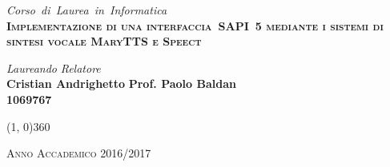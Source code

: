 \documentclass[a4paper, 12pt, twoside, openright]{book}
\begin{document}
\begin{titlepage}
\begin{center}
\vspace{0.3cm} %
\emph{\Large{Corso~di~Laurea~in~Informatica}} \\
\vspace{1.5cm}
\scshape{\Large{\bfseries{Implementazione di una interfaccia~SAPI~5 mediante i sistemi di sintesi vocale MaryTTS e Speect}}} \\
\end{center}

\vfill
\begin{normalsize}
\begin{flushleft}
  \hspace{45pt} \textit{Laureando} \hspace{160pt} \textit{Relatore}\\
  \vspace{5pt}
  \hspace{30pt} \large{\textbf{Cristian Andrighetto}} \hspace{70pt} \large{\textbf{Prof. Paolo Baldan}}\\
  \hspace{30pt} \large{\textbf{1069767}}
  \vspace{10pt}
\end{flushleft}
\end{normalsize}

\vfill
\begin{center}
\hspace{-0.2cm}
\line(1, 0){360}

\textsc{Anno Accademico 2016/2017}
\end{center}
\end{titlepage}

\cleardoublepage %

\thispagestyle{empty} 


\begingroup 
  \makeatletter
  \let\ps@plain\ps@empty
  \makeatother
  \tableofcontents
  \clearpage
\endgroup





\mainmatter









\backmatter

\printglossaries


\end{document}
